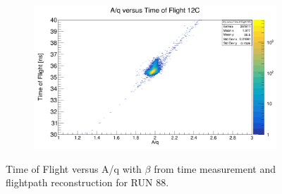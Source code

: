 \documentclass[12pt, letterpaper]{article}
\begin{document}
\begin{figure}[!htbp]
\begin{subfigure}{.5\textwidth}
  \caption{}
  \label{fig:sub-second}
\end{subfigure}
\begin{subfigure}{.5\textwidth}
  \centering
  \includegraphics[width=.9\linewidth]{aq_tof12c.png} 
  \caption{}
  \label{fig:sub-second}
\end{subfigure}
\caption{Time of Flight versus A/q with  $\beta$ from time measurement and flightpath reconstruction for RUN 88.}
\label{fig:aq_tof}
\end{figure}
\end{document}
